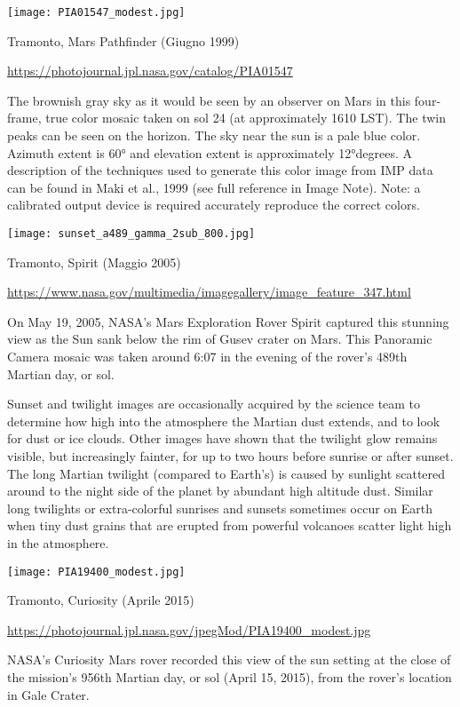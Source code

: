 \documentclass[a4paper,10pt,openany,oneside]{memoir}
\begin{document}
\texttt{[image: PIA01547\_modest.jpg]}

Tramonto, Mars Pathfinder (Giugno 1999)

\url{https://photojournal.jpl.nasa.gov/catalog/PIA01547}

The brownish gray sky as it would be seen by an observer on Mars in this four-frame, true color mosaic taken on sol 24 (at approximately 1610 LST). The twin peaks can be seen on the horizon. The sky near the sun is a pale blue color. Azimuth extent is 60° and elevation extent is approximately 12°degrees. A description of the techniques used to generate this color image from IMP data can be found in Maki et al., 1999 (see full reference in Image Note). Note: a calibrated output device is required accurately reproduce the correct colors.


\texttt{[image: sunset\_a489\_gamma\_2sub\_800.jpg]}

Tramonto, Spirit (Maggio 2005)

\url{https://www.nasa.gov/multimedia/imagegallery/image_feature_347.html}

On May 19, 2005, NASA's Mars Exploration Rover Spirit captured this stunning view as the Sun sank below the rim of Gusev crater on Mars. This Panoramic Camera mosaic was taken around 6:07 in the evening of the rover's 489th Martian day, or sol.

Sunset and twilight images are occasionally acquired by the science team to determine how high into the atmosphere the Martian dust extends, and to look for dust or ice clouds. Other images have shown that the twilight glow remains visible, but increasingly fainter, for up to two hours before sunrise or after sunset. The long Martian twilight (compared to Earth's) is caused by sunlight scattered around to the night side of the planet by abundant high altitude dust. Similar long twilights or extra-colorful sunrises and sunsets sometimes occur on Earth when tiny dust grains that are erupted from powerful volcanoes scatter light high in the atmosphere.


\texttt{[image: PIA19400\_modest.jpg]}

Tramonto, Curiosity (Aprile 2015)

\url{https://photojournal.jpl.nasa.gov/jpegMod/PIA19400_modest.jpg}

NASA's Curiosity Mars rover recorded this view of the sun setting at the close of the mission's 956th Martian day, or sol (April 15, 2015), from the rover's location in Gale Crater.
\end{document}
